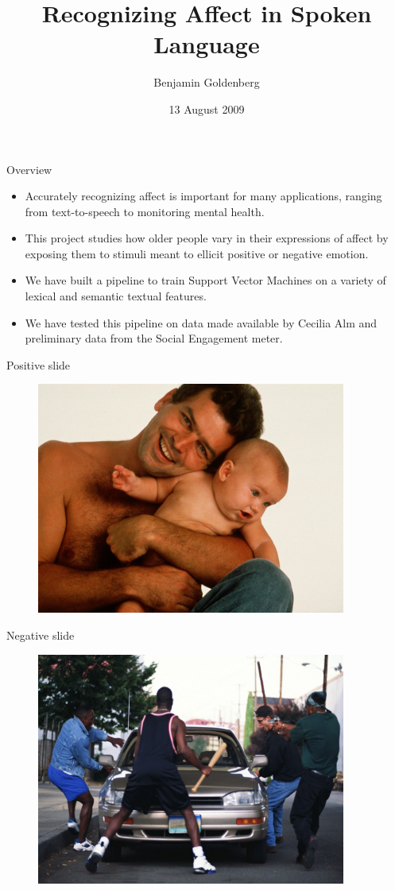 \documentclass{beamer}
\title{Recognizing Affect in Spoken Language}
\author{Benjamin Goldenberg}
\institute{Center for Spoken Language Understanding}
\date{13 August 2009}
\begin{document}
\begin{frame}
	\titlepage
\end{frame}

\begin{frame}{Overview}
	\begin{itemize}
		\item Accurately recognizing affect is important for many applications, ranging from text-to-speech to monitoring mental health.
		\item This project studies how older people vary in their expressions of affect by exposing them to stimuli meant to ellicit positive or negative emotion.
		\item We have built a pipeline to train Support Vector Machines on a variety of lexical and semantic textual features.
		\item We have tested this pipeline on data made available by Cecilia Alm and preliminary data from the Social Engagement meter.
	\end{itemize}
\end{frame}

\begin{frame}{Positive slide}
	\begin{figure}[htbp]
		\centering
			\includegraphics[height=3in]{figures/positive.jpg}
		\label{fig:figures_positive}
	\end{figure}	
\end{frame}

\begin{frame}{Negative slide}
	\begin{figure}[htbp]
		\centering
			\includegraphics[height=3in]{figures/negative.jpg}
		\label{fig:figures_negative}
	\end{figure}
\end{frame}
\end{document}
